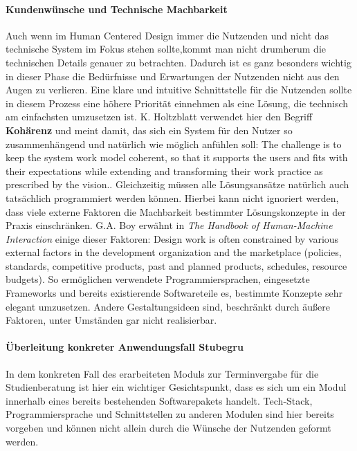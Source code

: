 \documentclass[12pt]{article}
\begin{document}
\paragraph{Kundenwünsche und Technische Machbarkeit}
Auch wenn im Human Centered Design immer die Nutzenden und nicht das technische
System im Fokus stehen sollte,kommt man nicht drumherum die technischen Details
genauer zu betrachten. Dadurch ist es ganz besonders wichtig in dieser Phase
die Bedürfnisse und Erwartungen der Nutzenden nicht aus den Augen zu verlieren.
Eine klare und intuitive Schnittstelle für die Nutzenden sollte in diesem
Prozess eine höhere Priorität einnehmen als eine Lösung, die technisch am
einfachsten umzusetzen ist. K. Holtzblatt verwendet hier den Begriff
\textbf{Kohärenz} und meint damit, das sich ein System für den Nutzer so
zusammenhängend und natürlich wie möglich anfühlen soll: \glqq{}The challenge
is to keep the system work model coherent, so that it supports the users and
fits with their expectations while extending and transforming their work
practice as prescribed by the vision.\grqq{}\cite{contextualDesign}.
Gleichzeitig müssen alle Lösungsansätze natürlich auch tatsächlich programmiert
werden können. Hierbei kann nicht ignoriert werden, dass viele externe Faktoren
die Machbarkeit bestimmter Lösungskonzepte in der Praxis einschränken. G.A. Boy
erwähnt in \textit{The Handbook of Human-Machine Interaction} einige dieser
Faktoren: \glqq{}Design work is often constrained by various external factors
in the development organization and the marketplace (policies, standards,
competitive products, past and planned products, schedules, resource
budgets).\grqq\cite{HMI-HCD} So ermöglichen verwendete Programmiersprachen,
eingesetzte Frameworks und bereits existierende Softwareteile es, bestimmte
Konzepte sehr elegant umzusetzen. Andere Gestaltungsideen sind, beschränkt
durch äußere Faktoren, unter Umständen gar nicht realisierbar.\cite{HMI-HCD}

\paragraph{Überleitung konkreter Anwendungsfall Stubegru}
In dem konkreten Fall des erarbeiteten Moduls zur Terminvergabe für die
Studienberatung ist hier ein wichtiger Gesichtspunkt, dass es sich um ein Modul
innerhalb eines bereits bestehenden Softwarepakets handelt. Tech-Stack,
Programmiersprache und Schnittstellen zu anderen Modulen sind hier bereits
vorgeben und können nicht allein durch die Wünsche der Nutzenden geformt
werden.
\end{document}
